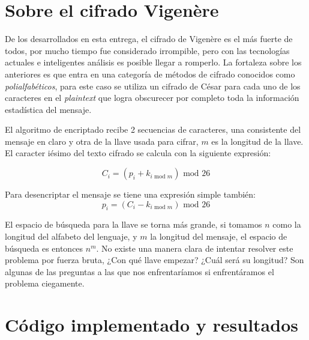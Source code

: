 \documentclass{article}
\begin{document}
    \section{Sobre el cifrado Vigenère}
        De los desarrollados en esta entrega, el cifrado de Vigenère es el más fuerte de todos, por mucho tiempo fue considerado irrompible, pero con las tecnologías actuales e inteligentes análisis es posible llegar a romperlo. La fortaleza sobre los anteriores es que entra en una categoría de métodos de cifrado conocidos como \emph{polialfabéticos}, para este caso se utiliza un cifrado de César para cada uno de los caracteres en el \emph{plaintext} que logra obscurecer por completo toda la información estadística del mensaje.

        El algoritmo de encriptado recibe 2 secuencias de caracteres, una consistente del mensaje en claro y otra de la llave usada para cifrar, $m$ es la longitud de la llave. El caracter iésimo del texto cifrado se calcula con la siguiente expresión:

        \begin{equation}
            C_i = (p_i + k_{i\text{ mod } m}) \text{ mod } 26
        \end{equation}

        Para desencriptar el mensaje se tiene una expresión simple también:
        \begin{equation}
            p_i = (C_i - k_{i\text{ mod } m}) \text{ mod } 26
        \end{equation}

        El espacio de búsqueda para la llave se torna más grande, si tomamos $n$ como la longitud del alfabeto del lenguaje, y $m$ la longitud del mensaje, el espacio de búsqueda es entonces $n^m$. No existe una manera clara de intentar resolver este problema por fuerza bruta, ¿Con qué llave empezar? ¿Cuál será su longitud? Son algunas de las preguntas a las que nos enfrentaríamos si enfrentáramos el problema ciegamente.
    
    \clearpage
    \appendix

    \section{Código implementado y resultados}
        
\end{document}
